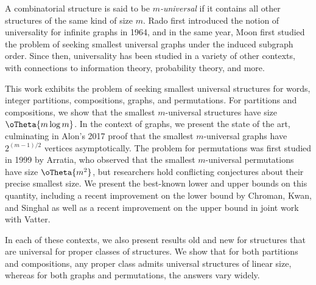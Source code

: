 A combinatorial structure is said to be \emph{$m$-universal} if it contains all other structures of the same kind of size $m$. Rado first introduced the notion of universality for infinite graphs in 1964, and in the same year, Moon first studied the problem of seeking smallest universal graphs under the induced subgraph order. Since then, universality has been studied in a variety of other contexts, with connections to information theory, probability theory, and more.

This work exhibits the problem of seeking smallest universal structures for words, integer partitions, compositions, graphs, and permutations. For partitions and compositions, we show that the smallest $m$-universal structures have size $\oTheta{m \log m}$. In the context of graphs, we present the state of the art, culminating in Alon's 2017 proof that the smallest $m$-universal graphs have $2^{(m-1)/2}$ vertices asymptotically. The problem for permutations was first studied in 1999 by Arratia, who observed that the smallest $m$-universal permutations have size $\oTheta{m^2}$, but researchers hold conflicting conjectures about their precise smallest size. We present the best-known lower and upper bounds on this quantity, including a recent improvement on the lower bound by Chroman, Kwan, and Singhal as well as a recent improvement on the upper bound in joint work with Vatter.

In each of these contexts, we also present results old and new for structures that are universal for proper classes of structures. We show that for both partitions and compositions, any proper class admits universal structures of linear size, whereas for both graphs and permutations, the answers vary widely.